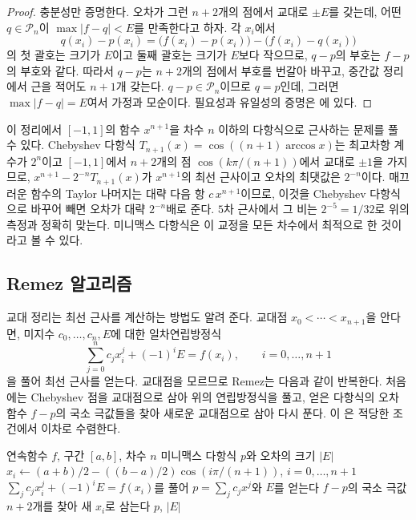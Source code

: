 \begin{proof}
충분성만 증명한다. 오차가 그런 $n+2$개의 점에서 교대로 $\pm E$를 갖는데, 어떤 $q\in\mathcal P_n$이 $\max|f-q|<E$를 만족한다고 하자. 각 $x_i$에서
\[
q(x_i)-p(x_i)=\bigl(f(x_i)-p(x_i)\bigr)-\bigl(f(x_i)-q(x_i)\bigr)
\]
의 첫 괄호는 크기가 $E$이고 둘째 괄호는 크기가 $E$보다 작으므로, $q-p$의 부호는 $f-p$의 부호와 같다. 따라서 $q-p$는 $n+2$개의 점에서 부호를 번갈아 바꾸고, 중간값 정리에서 근을 적어도 $n+1$개 갖는다. $q-p\in\mathcal P_n$이므로 $q=p$인데, 그러면 $\max|f-q|=E$여서 가정과 모순이다. 필요성과 유일성의 증명은 \cite{cheney1998}에 있다.
\end{proof}

이 정리에서 $[-1,1]$의 함수 $x^{n+1}$을 차수 $n$ 이하의 다항식으로 근사하는 문제를 풀 수 있다. Chebyshev 다항식 $T_{n+1}(x)=\cos((n+1)\arccos x)$는 최고차항 계수가 $2^n$이고 $[-1,1]$에서 $n+2$개의 점 $\cos(k\pi/(n+1))$에서 교대로 $\pm1$을 가지므로, $x^{n+1}-2^{-n}T_{n+1}(x)$가 $x^{n+1}$의 최선 근사이고 오차의 최댓값은 $2^{-n}$이다. 매끄러운 함수의 Taylor 나머지는 대략 다음 항 $c\,x^{n+1}$이므로, 이것을 Chebyshev 다항식으로 바꾸어 빼면 오차가 대략 $2^{-n}$배로 준다. $5$차 근사에서 그 비는 $2^{-5}=1/32$로 위의 측정과 정확히 맞는다. 미니맥스 다항식은 이 교정을 모든 차수에서 최적으로 한 것이라고 볼 수 있다.

\subsection{Remez 알고리즘}

교대 정리는 최선 근사를 계산하는 방법도 알려 준다. 교대점 $x_0<\cdots<x_{n+1}$을 안다면, 미지수 $c_0,\dots,c_n,E$에 대한 일차연립방정식
\[
\sum_{j=0}^nc_jx_i^j+(-1)^iE=f(x_i),\qquad i=0,\dots,n+1
\]
을 풀어 최선 근사를 얻는다. 교대점을 모르므로 Remez는 다음과 같이 반복한다. 처음에는 Chebyshev 점을 교대점으로 삼아 위의 연립방정식을 풀고, 얻은 다항식의 오차 함수 $f-p$의 국소 극값들을 찾아 새로운 교대점으로 삼아 다시 푼다. 이 은 적당한 조건에서 이차로 수렴한다\cite{trefethen2019atap}.

\begin{algorithm}[t]
\begin{algorithmic}[1]
\Require 연속함수 $f$, 구간 $[a,b]$, 차수 $n$
\Ensure 미니맥스 다항식 $p$와 오차의 크기 $|E|$
\State $x_i\gets(a+b)/2-((b-a)/2)\cos(i\pi/(n+1))$, $i=0,\dots,n+1$ 
\Repeat
  \State $\sum_jc_jx_i^j+(-1)^iE=f(x_i)$를 풀어 $p=\sum_jc_jx^j$와 $E$를 얻는다
  \State $f-p$의 국소 극값 $n+2$개를 찾아 새 $x_i$로 삼는다 
\State \Return $p$, $|E|$
\end{algorithmic}
\caption{Remez의 교환 알고리즘}
\label{alg:remez}
\end{algorithm}

